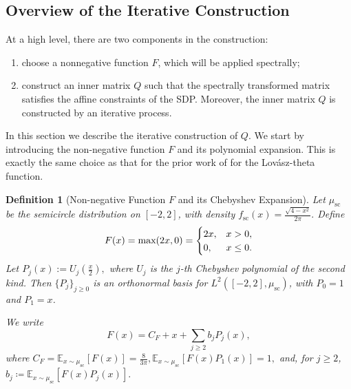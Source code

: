 \documentclass[12pt]{article}
\def \E {\mathbb{E}}
\newtheorem{definition}[theorem]{Definition}
\newcommand{\Lovasz}{Lov\'asz\xspace}
\newcommand{\Authornote}[3]{{\sf\footnotesize\color{#3}{[#1: #2]}}}
\newcommand{\Authornote}[3]{}
\newcommand{\snote}[1]{\Authornote{Sofia}{#1}{orange}}
\begin{document}
\subsection{Overview of the Iterative Construction }
At a high level, there are two components in the construction:
\begin{enumerate}
    \item choose a nonnegative function \(F\), which will be applied spectrally;
    \item construct an inner matrix \(Q\) such that the spectrally transformed
    matrix satisfies the affine constraints of the SDP. Moreover, the inner matrix $Q$ is constructed by an iterative process.
\end{enumerate}

In this section we describe the iterative construction of \(Q\). We start by introducing the non-negative function $F$ and its polynomial expansion. This is exactly the same choice as that for the prior work of \cite{PotechinXu2026Theta} for the \Lovasz-theta function.
\begin{definition}[Non-negative Function \(F\) and its Chebyshev Expansion]
\label{def:F-function}
Let \(\mu_{\mathrm{sc}}\) be the semicircle distribution on \([-2,2]\), with density
\(
    f_{\mathrm{sc}}(x)
    =
    \frac{\sqrt{4-x^2}}{2\pi}.
\)
Define
\[F(x)=\textup{max}(2x,0)=\begin{cases}
        2x, & x>0,\\
        0,  & x\leq 0.
    \end{cases}\]
Let
\(
    P_j(x):=U_j\left(\frac{x}{2}\right),
\)
where \(U_j\) is the \(j\)-th Chebyshev polynomial of the second kind. Then
\(\{P_j\}_{j\ge0}\) is an orthonormal basis for
\(L^2([-2,2],\mu_{\mathrm{sc}})\), with \(P_0=1\) and \(P_1=x\).

We write
\[
    F(x)
    =
    C_F+x+\sum_{j\ge2} b_j P_j(x),
\]
where
\(
    C_F
    =
    \mathbb E_{x\sim\mu_{\mathrm{sc}}}[F(x)]
    =
    \frac{8}{3\pi},
    \mathbb E_{x\sim\mu_{\mathrm{sc}}}[F(x)P_1(x)]=1,
\)
and, for \(j\ge2\),
\(
    b_j\coloneqq
    \E_{x\sim\mu_{\mathrm{sc}}}[F(x)P_j(x)].
\)
\end{definition}
\end{document}
